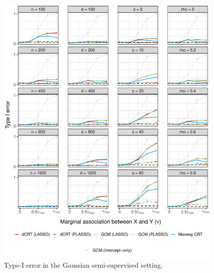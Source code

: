 \documentclass[aos]{imsart}
\theoremstyle{definition}
\theoremstyle{remark}
\begin{document}
\begin{figure}[!ht]
	\centering
	\includegraphics[width = \textwidth]{figures/gaussian_semi_supervised_setting_null.pdf}
	\caption{Type-I error in the Gaussian semi-supervised setting.}
	\label{fig:gaussian_semi-supervised_null}
\end{figure}
\end{document}

